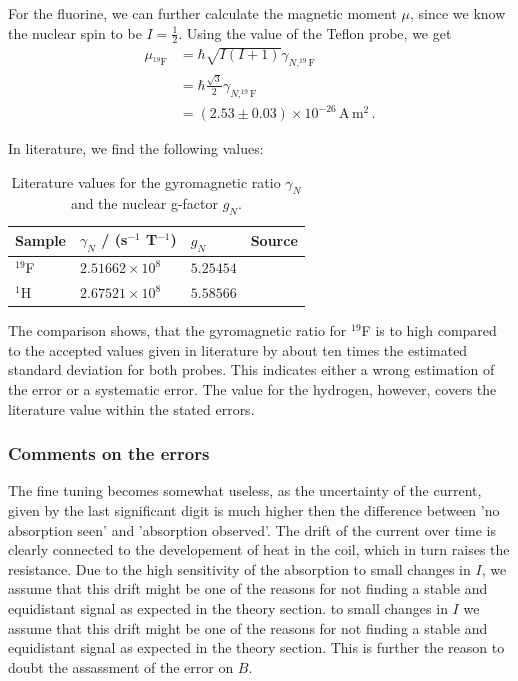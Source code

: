 For the fluorine, we can further calculate the magnetic moment $\mu$, since we know the 
nuclear spin to be $I = \frac{1}{2}$. Using the value of the Teflon probe, we get 
\begin{equation}
    \begin{split}
        \mu_{^{19}\mathrm{F}} &= \hbar \sqrt{I(I + 1)}  \gamma_{N, ^{19}\mathrm{F}} \\
            &= \hbar \frac{\sqrt{3}}{2}  \gamma_{N, ^{19}\mathrm{F}} \\
            &= \left(2.53 \pm 0.03\right) \times 10^{-26} \, \mathrm{A \, m^2}\, .
    \end{split}
\end{equation}

In literature, we find the following values:
\renewcommand{\arraystretch}{1.5}
\begin{table}[H]
\centering
\begin{tabular}{|p{3.82cm}|p{3.82cm}|p{3.82cm}|p{2.00cm}|}
        \hline
        \rowcolor{LightCyan}
        Sample & $\gamma_N$ / (s$^{-1}$ T$^{-1}$) & $g_N$ & Source\\ \hline
        $^{19}$F    & $ 2.51662 \times 10^{8}$  & $ 5.25454$ & \cite{nist}\\ 
        $^1$H       & $ 2.67521 \times 10^{8}$  & $ 5.58566$ & \cite{crc}\\
        \hline
    \end{tabular}
    \caption{
        Literature values for the gyromagnetic ratio $\gamma_N$ and the nuclear g-factor $g_N$.
        }
    \label{tab:g_N}
\end{table}
The comparison shows, that the gyromagnetic ratio for $^{19}$F is to high compared to the 
accepted values given in literature by about ten times the estimated standard deviation for both probes. 
This indicates either a wrong estimation of the error or a systematic error. 
The value for the hydrogen, however, covers the literature value within the stated errors. 


\subsubsection{Comments on the errors}

The fine tuning becomes somewhat useless, as the uncertainty of the current, given by the last 
significant digit is much higher then the difference between 'no absorption seen' and 
'absorption observed'. The drift of the current over time is clearly connected to the developement 
of heat in the coil, which in turn raises the resistance. Due to the high sensitivity of the absorption 
to small changes in $I$, we assume that this drift might be one of the reasons for not finding 
a stable and equidistant signal as expected in the theory section.
to small changes in $I$ we assume that this drift might be one of the reasons for not finding 
a stable and equidistant signal as expected in the theory section.  This is further the reason to 
doubt the assassment of the error on $B$. 





